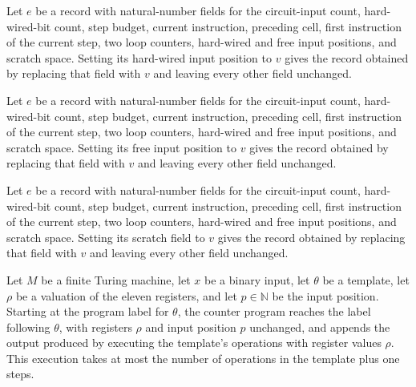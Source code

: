 \begin{theorem}
\label{Complexity.UTab.ER.set_pa}
\leanok
{}
Let $e$ be a record with natural-number fields for the circuit-input count,
hard-wired-bit count, step budget, current instruction, preceding cell, first
instruction of the current step, two loop counters, hard-wired and free input positions,
and scratch space. Setting its hard-wired input position to $v$ gives the record
obtained by replacing that field with $v$ and leaving every other field unchanged.
\end{theorem}

\begin{theorem}
\label{Complexity.UTab.ER.set_pb}
\leanok
{}
Let $e$ be a record with natural-number fields for the circuit-input count,
hard-wired-bit count, step budget, current instruction, preceding cell, first
instruction of the current step, two loop counters, hard-wired and free input positions,
and scratch space. Setting its free input position to $v$ gives the record obtained by
replacing that field with $v$ and leaving every other field unchanged.
\end{theorem}

\begin{theorem}
\label{Complexity.UTab.ER.set_tmp}
\leanok
{}
Let $e$ be a record with natural-number fields for the circuit-input count,
hard-wired-bit count, step budget, current instruction, preceding cell, first
instruction of the current step, two loop counters, hard-wired and free input positions,
and scratch space. Setting its scratch field to $v$ gives the record obtained by
replacing that field with $v$ and leaving every other field unchanged.
\end{theorem}

\begin{theorem}
\label{Complexity.UTab.goes_tp}
\leanok
{}
Let $M$ be a finite Turing machine, let $x$ be a binary input, let $\theta$ be a
template, let $\rho$ be a valuation of the eleven registers, and let $p\in\mathbb N$ be
the input position. Starting at the program label for $\theta$, the counter program
reaches the label following $\theta$, with registers $\rho$ and input position $p$
unchanged, and appends the output produced by executing the template's operations with
register values $\rho$. This execution takes at most the number of operations in the
template plus one steps.
\end{theorem}


